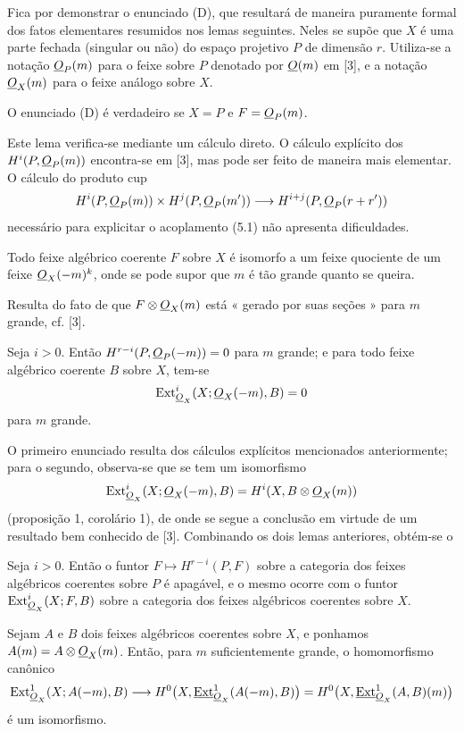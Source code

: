 Fica por demonstrar o enunciado (D), que resultará de maneira puramente formal dos fatos
elementares resumidos nos lemas seguintes. Neles se supõe que $X$ é uma
parte fechada (singular ou não) do espaço projetivo $P$ de dimensão $r$.
Utiliza-se a notação $\underline{O}_P(m)$ para o feixe sobre $P$ denotado por $\underline{O}(m)$ em
[3], e a notação $\underline{O}_X(m)$ para o feixe análogo sobre $X$.

 O enunciado (D) é verdadeiro se $X=P$ e $F=\underline{O}_P(m)$.

Este lema verifica-se mediante um cálculo direto. O cálculo explícito dos
$H^{i}(P,\underline{O}_P(m))$ encontra-se em [3], mas pode ser feito de maneira mais
elementar. O cálculo do produto cup
\[
  H^{i}(P,\underline{O}_P(m))\times H^{j}(P,\underline{O}_P(m'))
  \longrightarrow H^{i+j}(P,\underline{O}_P(r+r'))
\]
necessário para explicitar o acoplamento (5.1) não apresenta
dificuldades.

 Todo feixe algébrico coerente $F$ sobre $X$ é isomorfo a
um feixe quociente de um feixe $\underline{O}_X(-m)^{k}$, onde se pode supor que $m$ é
tão grande quanto se queira.

Resulta do fato de que $F\otimes\underline{O}_X(m)$ está « gerado por suas seções » para
$m$ grande, cf. [3].

 Seja $i>0$. Então
$H^{r-i}(P,\underline{O}_P(-m))=0$ para $m$ grande; e para todo feixe algébrico
coerente $B$ sobre $X$, tem-se
\[
  \operatorname{Ext}_{\underline{O}_X}^{i}(X;\underline{O}_X(-m),B)=0
\]
para $m$ grande.

O primeiro enunciado resulta dos cálculos explícitos mencionados anteriormente; para o
segundo, observa-se que se tem um isomorfismo
\[
  \operatorname{Ext}_{\underline{O}_X}^{i}(X;\underline{O}_X(-m),B)
  =H^{i}(X,B\otimes\underline{O}_X(m))
\]
(proposição 1, corolário 1), de onde se segue a conclusão em virtude de um resultado bem
conhecido de [3]. Combinando os dois lemas anteriores, obtém-se o

 Seja $i>0$. Então o funtor
$F\longmapsto H^{r-i}(P,F)$ sobre a categoria dos feixes algébricos coerentes
sobre $P$ é apagável, e o mesmo ocorre com o funtor
$\operatorname{Ext}_{\underline{O}_X}^{i}(X;F,B)$ sobre a categoria dos feixes
algébricos coerentes sobre $X$.

 Sejam $A$ e $B$ dois feixes algébricos coerentes sobre
$X$, e ponhamos $A(m)=A\otimes\underline{O}_X(m)$. Então, para $m$ suficientemente grande,
o homomorfismo canônico
\[
  \operatorname{Ext}_{\underline{O}_X}^{1}(X;A(-m),B)
  \longrightarrow H^{0}\bigl(X,\underline{\operatorname{Ext}}_{\underline{O}_X}^{1}(A(-m),B)\bigr)
  =H^{0}\bigl(X,\underline{\operatorname{Ext}}_{\underline{O}_X}^{1}(A,B)(m)\bigr)
\]
é um isomorfismo.


